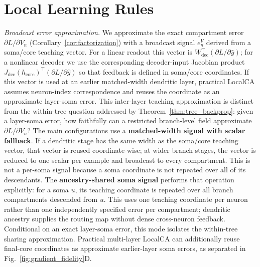     \section{Local Learning Rules}
    \label{sec:local_rules}
    
    \noindent\emph{Broadcast error approximation.}
    We approximate the exact compartment error $\partial L / \partial V_n$ (Corollary~\ref{cor:factorization}) with a broadcast signal $e_n^V$ derived from a soma/core teaching vector. For a linear readout this vector is $W_{\mathrm{dec}}^\top (\partial L / \partial \hat{y})$; for a nonlinear decoder we use the corresponding decoder-input Jacobian product $J_{\mathrm{dec}}(h_{\mathrm{core}})^\top (\partial L / \partial \hat{y})$ so that feedback is defined in soma/core coordinates.
    If this vector is used at an earlier matched-width dendritic layer, practical LocalCA assumes neuron-index correspondence and reuses the coordinate as an approximate layer-soma error. This inter-layer teaching approximation is distinct from the within-tree question addressed by Theorem~\ref{thm:tree_backprop}: given a layer-soma error, how faithfully can a restricted branch-level field approximate $\partial L/\partial V_n$?
    The main configurations use a \textbf{matched-width signal with scalar fallback}. If a dendritic stage has the same width as the soma/core teaching vector, that vector is reused coordinate-wise; at wider branch stages, the vector is reduced to one scalar per example and broadcast to every compartment. This is not a per-soma signal because a soma coordinate is not repeated over all of its descendants. The \textbf{ancestry-shared soma signal} performs that operation explicitly: for a soma $u$, its teaching coordinate is repeated over all branch compartments descended from $u$. This uses one teaching coordinate per neuron rather than one independently specified error per compartment; dendritic ancestry supplies the routing map without dense cross-neuron feedback. Conditional on an exact layer-soma error, this mode isolates the within-tree sharing approximation. Practical multi-layer LocalCA can additionally reuse final-core coordinates as approximate earlier-layer soma errors, as separated in Fig.~\ref{fig:gradient_fidelity}D.

